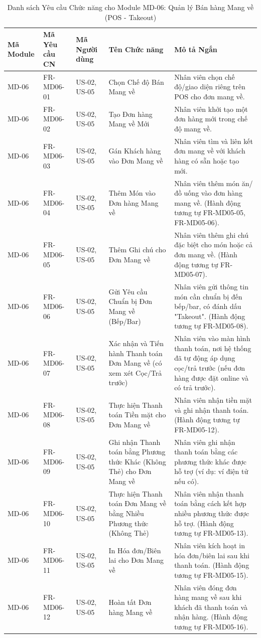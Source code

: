 \begin{longtable}{|m{2cm}|m{2.5cm}|m{2.5cm}|m{4.5cm}|m{4cm}|}
\caption{Danh sách Yêu cầu Chức năng cho Module MD-06: Quản lý Bán hàng Mang về (POS - Takeout)} \label{tab:fr_md06_revised_v3} \\
\hline
\textbf{Mã Module} & \textbf{Mã Yêu cầu CN} & \textbf{Mã Người dùng} & \textbf{Tên Chức năng} & \textbf{Mô tả Ngắn} \\
\hline
\endhead %
\hline
\endfoot %
\hline
\endlastfoot %

MD-06 & FR-MD06-01 & US-02, US-05 & Chọn Chế độ Bán Mang về & Nhân viên chọn chế độ/giao diện riêng trên POS cho đơn mang về. \\
\hline
MD-06 & FR-MD06-02 & US-02, US-05 & Tạo Đơn hàng Mang về Mới & Nhân viên khởi tạo một đơn hàng mới trong chế độ mang về. \\
\hline
MD-06 & FR-MD06-03 & US-02, US-05 & Gán Khách hàng vào Đơn Mang về & Nhân viên tìm và liên kết đơn mang về với khách hàng có sẵn hoặc tạo mới. \\
\hline
MD-06 & FR-MD06-04 & US-02, US-05 & Thêm Món vào Đơn hàng Mang về & Nhân viên thêm món ăn/đồ uống vào đơn hàng mang về. (Hành động tương tự FR-MD05-05, FR-MD05-06). \\
\hline
MD-06 & FR-MD06-05 & US-02, US-05 & Thêm Ghi chú cho Đơn Mang về & Nhân viên thêm ghi chú đặc biệt cho món hoặc cả đơn mang về. (Hành động tương tự FR-MD05-07). \\
\hline
MD-06 & FR-MD06-06 & US-02, US-05 & Gửi Yêu cầu Chuẩn bị Đơn Mang về (Bếp/Bar) & Nhân viên gửi thông tin món cần chuẩn bị đến bếp/bar, có đánh dấu "Takeout". (Hành động tương tự FR-MD05-08). \\
\hline
MD-06 & FR-MD06-07 & US-02, US-05 & Xác nhận và Tiến hành Thanh toán Đơn Mang về (có xem xét Cọc/Trả trước) & Nhân viên vào màn hình thanh toán, nơi hệ thống đã tự động áp dụng cọc/trả trước (nếu đơn hàng được đặt online và có trả trước). \\
\hline
MD-06 & FR-MD06-08 & US-02, US-05 & Thực hiện Thanh toán Tiền mặt cho Đơn Mang về & Nhân viên nhận tiền mặt và ghi nhận thanh toán. (Hành động tương tự FR-MD05-12). \\
\hline
MD-06 & FR-MD06-09 & US-02, US-05 & Ghi nhận Thanh toán bằng Phương thức Khác (Không Thẻ) cho Đơn Mang về & Nhân viên ghi nhận thanh toán bằng các phương thức khác được hỗ trợ (ví dụ: ví điện tử nếu có). \\
\hline
MD-06 & FR-MD06-10 & US-02, US-05 & Thực hiện Thanh toán Đơn Mang về bằng Nhiều Phương thức (Không Thẻ) & Nhân viên nhận thanh toán bằng cách kết hợp nhiều phương thức được hỗ trợ. (Hành động tương tự FR-MD05-13). \\
\hline
MD-06 & FR-MD06-11 & US-02, US-05 & In Hóa đơn/Biên lai cho Đơn Mang về & Nhân viên kích hoạt in hóa đơn/biên lai sau khi thanh toán. (Hành động tương tự FR-MD05-15). \\
\hline
MD-06 & FR-MD06-12 & US-02, US-05 & Hoàn tất Đơn hàng Mang về & Nhân viên đóng đơn hàng mang về sau khi khách đã thanh toán và nhận hàng. (Hành động tương tự FR-MD05-16). \\
\hline


\end{longtable}
